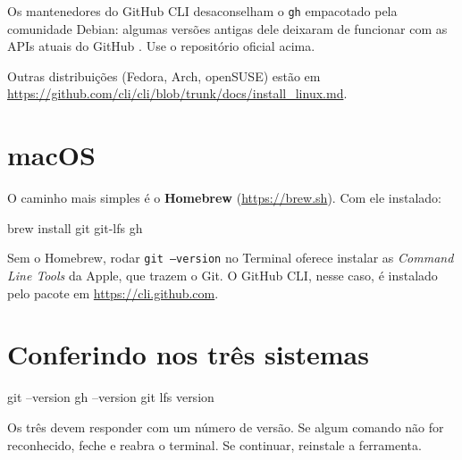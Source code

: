 \begin{aviso}
Os mantenedores do GitHub CLI desaconselham o \texttt{gh} empacotado pela
comunidade Debian: algumas versões antigas dele deixaram de funcionar com as
APIs atuais do GitHub \cite{gh_linux}. Use o repositório oficial acima.
\end{aviso}

Outras distribuições (Fedora, Arch, openSUSE) estão em
\url{https://github.com/cli/cli/blob/trunk/docs/install_linux.md}.

\section{macOS}

O caminho mais simples é o \textbf{Homebrew} (\url{https://brew.sh}). Com ele
instalado:

\begin{bashcode}
brew install git git-lfs gh
\end{bashcode}

\begin{dica}
Sem o Homebrew, rodar \texttt{git --version} no Terminal oferece instalar as
\emph{Command Line Tools} da Apple, que trazem o Git. O GitHub CLI, nesse
caso, é instalado pelo pacote em \url{https://cli.github.com}.
\end{dica}

\section{Conferindo nos três sistemas}

\begin{bashcode}
git --version
gh --version
git lfs version
\end{bashcode}

Os três devem responder com um número de versão. Se algum comando não for
reconhecido, feche e reabra o terminal. Se continuar, reinstale a ferramenta.
